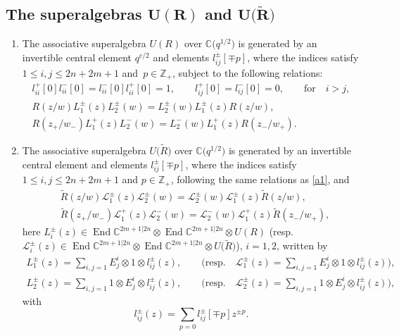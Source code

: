 \documentclass[10pt,a4paper]{amsart}
\numberwithin{equation}{section}
\begin{document}
\subsection[The superalgebras U(R) and U(R)]{The superalgebras $\boldsymbol{U(R)}$ and $\boldsymbol{U\bigl(\widetilde{R}\bigr)}$ }


\begin{Definition}\quad
\begin{enumerate}\itemsep=0pt
\item[(1)] The associative superalgebra $U(R)$ over $\mathbb{C}\bigl(q^{1/2}\bigr)$ is generated by an invertible central element $q^{c/2}$ and elements $l_{ij}^{\pm}[\mp p]$, where the indices satisfy $ 1\leq i,j\leq2n+2m+1$ and~${p\in\mathbb{Z}_+}$,
 subject to the following relations:
\begin{gather}%
 l^+_{ii}[0]l^-_{ii}[0]=l^-_{ii}[0] l^+_{ii}[0]=1, \qquad l^+_{ij}[0]=l^-_{ij}[0]=0,\qquad \text{for} \quad i>j,\nonumber\\
 R(z/w)L_1^{\pm}(z)L_2^{\pm}(w)=L_2^{\pm}(w)L_1^{\pm}(z) R(z/w),\nonumber\\
 R(z_+/w_-)L_1^{+}(z)L_2^{-}(w)=L_2^{-}(w)L_1^{+}(z) R(z_-/w_+).\label{a1}
\end{gather}
\item[(2)] The associative superalgebra $U\bigl(\widetilde{R}\bigr)$ over $\mathbb{C}\bigl(q^{1/2}\bigr)$ is generated by an invertible central element  and elements $l_{ij}^{\pm}[\mp p]$, where the indices satisfy $ 1\leq i,j\leq2n+2m+1$ and {$p\in\mathbb{Z}_+$,}
 following the same relations as \eqref{a1}, and
\begin{align}
 \label{d2}
 &\widetilde{R}(z/w)\mathcal{L}_1^{\pm}(z)\mathcal{L}_2^{\pm}(w)=\mathcal{L}_2^{\pm}(w)\mathcal{L}_1^{\pm}(z) \widetilde{R}(z/w),\\
 \label{d3}
 &\widetilde{R}(z_+/w_-)\mathcal{L}_1^{+}(z)\mathcal{L}_2^{-}(w)=\mathcal{L}_2^{-}(w)\mathcal{L}_1^{+}(z) \widetilde{R}(z_-/w_+),
\end{align}
here $L_i^{\pm}(z)\in \operatorname{End} \mathbb{C}^{2m+1|2n}\otimes \operatorname{End} \mathbb{C}^{2m+1|2n}\otimes
 U(R)$ \big(resp.\ $\mathcal{L}_i^{\pm}(z)\in \operatorname{End} \mathbb{C}^{2m+1|2n}\otimes \operatorname{End} \mathbb{C}^{2m+1|2n}\allowbreak\otimes
 U\bigl(\widetilde{R}\bigr)$\big), $i=1,2$, written by
\begin{gather*}
 L_1^{\pm}(z)=\sum\limits_{i,j=1}E^i_j\otimes1\otimes l_{ij}^{\pm}(z),\qquad \biggl(\text{resp}.\quad \mathcal{L}_1^{\pm}(z)=\sum\limits_{i,j=1}E^i_j\otimes1\otimes l_{ij}^{\pm}(z)\biggr), \\
 L_2^{\pm}(z)=\sum\limits_{i,j=1}1\otimes E^i_j\otimes l_{ij}^{\pm}(z), \qquad \biggl(\text{resp}.\quad \mathcal{L}_2^{\pm}(z)=\sum\limits_{i,j=1}1\otimes E^i_j\otimes l_{ij}^{\pm}(z)\biggr),
\end{gather*}
with
\begin{equation*}
 l_{ij}^{\pm}(z)=\sum\limits_{p=0}l_{ij}^{\pm}[\mp p]z^{\pm p}.
\end{equation*}
\end{enumerate}
\end{Definition}
\end{document}
